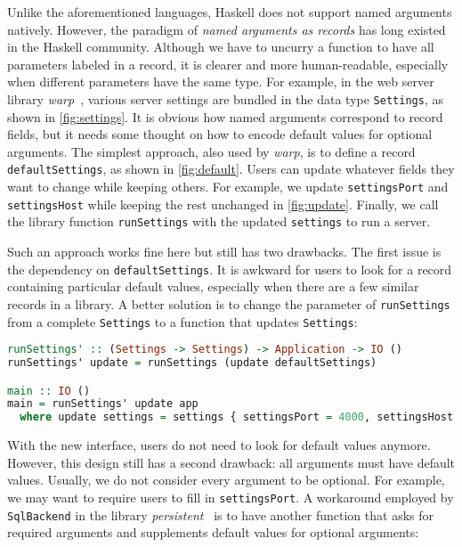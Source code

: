 Unlike the aforementioned languages, Haskell does not support named arguments
natively. However, the paradigm of \emph{named arguments as records} has long
existed in the Haskell community. Although we have to uncurry a function to have
all parameters labeled in a record, it is clearer and more human-readable,
especially when different parameters have the same type. For example, in the web
server library \emph{warp}~\citep{warp}, various server settings are bundled in
the data type \lstinline{Settings}, as shown in \autoref{fig:settings}. It is
obvious how named arguments correspond to record fields, but it needs some
thought on how to encode default values for optional arguments. The simplest
approach, also used by \emph{warp}, is to define a record
\lstinline{defaultSettings}, as shown in \autoref{fig:default}. Users can update
whatever fields they want to change while keeping others. For example, we update
\lstinline{settingsPort} and \lstinline{settingsHost} while keeping the rest
unchanged in \autoref{fig:update}. Finally, we call the library function
\lstinline{runSettings} with the updated \lstinline{settings} to run a server.

Such an approach works fine here but still has two drawbacks. The first issue is
the dependency on \lstinline{defaultSettings}. It is awkward for users to look
for a record containing particular default values, especially when there are a
few similar records in a library. A better solution is to change the parameter
of \lstinline{runSettings} from a complete \lstinline{Settings} to a function
that updates \lstinline{Settings}:

\begin{lstlisting}[language=Haskell]
runSettings' :: (Settings -> Settings) -> Application -> IO ()
runSettings' update = runSettings (update defaultSettings)

main :: IO ()
main = runSettings' update app
  where update settings = settings { settingsPort = 4000, settingsHost = "*6" }
\end{lstlisting}

\noindent With the new interface, users do not need to look for default values
anymore. However, this design still has a second drawback: all arguments must
have default values. Usually, we do not consider every argument to be optional.
For example, we may want to require users to fill in \lstinline{settingsPort}. A
workaround employed by \lstinline{SqlBackend} in the library
\emph{persistent}~\citep{persistent} is to have another function that asks for
required arguments and supplements default values for optional arguments:

